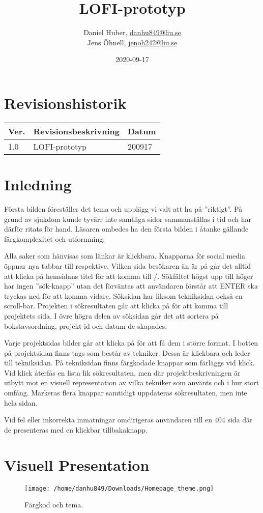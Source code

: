 \documentclass{TDP003mall}
\author{Daniel Huber, \url{danhu849@liu.se}\\
  Jens Öhnell, \url{jenoh242@liu.se}}
\title{LOFI-prototyp}
\date{2020-09-17}
\begin{document}
\projectpage
\section{Revisionshistorik}
\begin{table}[!h]
\begin{tabularx}{\linewidth}{|l|X|l|}
\hline
Ver. & Revisionsbeskrivning & Datum \\\hline
1.0 & LOFI-prototyp & 200917 \\\hline
\end{tabularx}
\end{table}

\section{Inledning}
Första bilden föreställer det tema och upplägg vi valt att ha på ''riktigt''. På grund av sjukdom kunde tyvärr inte samtliga sidor sammanställas i tid och har därför ritats för hand. Läsaren ombedes ha den första bilden i åtanke gällande färgkomplexitet och utformning.

Alla saker som hänvisas som länkar är klickbara. Knapparna för social media öppnar nya tabbar till respektive. Vilken sida besökaren än är på går det alltid att klicka på hemsidans titel för att komma till /. Sökfältet högst upp till höger har ingen ''sök-knapp'' utan det förväntas att användaren förstår att ENTER ska tryckas ned för att komma vidare. Söksidan har liksom tekniksidan också en scroll-bar. Projekten i sökresultaten går att klicka på för att komma till projektets sida. I övre högra delen av söksidan går det att sortera på bokstavsordning, projekt-id och datum de skapades.

Varje projektsidas bilder går att klicka på för att få dem i större format. I botten på projektsidan finns tags som består av tekniker. Dessa är klickbara och leder till tekniksidan. På tekniksidan finns färgkodade knappar som färläggs vid klick. Vid klick återfås en lista lik sökresultaten, men där projektbeskrivningen är utbytt mot en visuell representation av vilka tekniker som använts och i hur stort omfång. Markeras flera knappar samtidigt uppdateras sökresultaten, men inte hela sidan.

Vid fel eller inkorrekta inmatningar omdirigeras användaren till en 404 sida där de presenteras med en klickbar tillbakaknapp.

\section{Visuell Presentation}
\begin{figure}[h]
  \centerline{\texttt{[image: /home/danhu849/Downloads/Homepage\_theme.png]}}
  \caption{Färgkod och tema.}
  \label{fig}
\end{figure}
\end{document}
